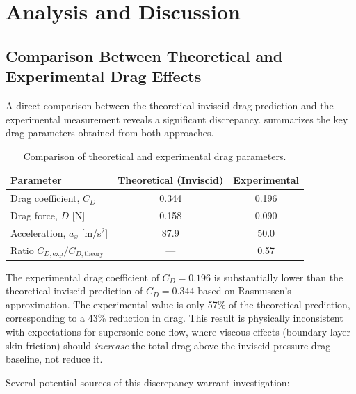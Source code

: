 \section{Analysis and Discussion} \label{sec:analysis}

\subsection{Comparison Between Theoretical and Experimental Drag Effects} \label{sec:analysis/comparison}

A direct comparison between the theoretical inviscid drag prediction and the experimental measurement reveals a significant discrepancy.  summarizes the key drag parameters obtained from both approaches.

\begin{table}[H]
    \centering
    \caption{Comparison of theoretical and experimental drag parameters.}
    \label{tab:analysis/comparison/drag-summary}
    \begin{tabular}{lcc}
        \toprule
        \textbf{Parameter} & \textbf{Theoretical (Inviscid)} & \textbf{Experimental} \\
        \midrule
        Drag coefficient, $C_D$ & 0.344 & 0.196 \\
        Drag force, $D$ [N] & 0.158 & 0.090 \\
        Acceleration, $a_x$ [m/s$^2$] & 87.9 & 50.0 \\
        Ratio $C_{D,\text{exp}}/C_{D,\text{theory}}$ & --- & 0.57 \\
        \bottomrule
    \end{tabular}
\end{table}

The experimental drag coefficient of $C_D = 0.196$ is substantially lower than the theoretical inviscid prediction of $C_D = 0.344$ based on Rasmussen's approximation. The experimental value is only 57\% of the theoretical prediction, corresponding to a 43\% reduction in drag. This result is physically inconsistent with expectations for supersonic cone flow, where viscous effects (boundary layer skin friction) should \textit{increase} the total drag above the inviscid pressure drag baseline, not reduce it.

Several potential sources of this discrepancy warrant investigation:

